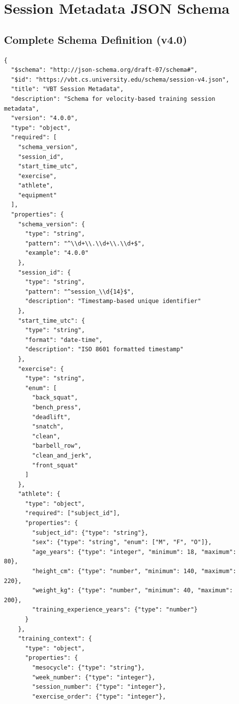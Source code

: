 \chapter{Session Metadata JSON Schema}

\section{Complete Schema Definition (v4.0)}

\begin{lstlisting}[caption={Complete Schema Definition JSON}]
{
  "$schema": "http://json-schema.org/draft-07/schema#",
  "$id": "https://vbt.cs.university.edu/schema/session-v4.json",
  "title": "VBT Session Metadata",
  "description": "Schema for velocity-based training session metadata",
  "version": "4.0.0",
  "type": "object",
  "required": [
    "schema_version",
    "session_id",
    "start_time_utc",
    "exercise",
    "athlete",
    "equipment"
  ],
  "properties": {
    "schema_version": {
      "type": "string",
      "pattern": "^\\d+\\.\\d+\\.\\d+$",
      "example": "4.0.0"
    },
    "session_id": {
      "type": "string",
      "pattern": "^session_\\d{14}$",
      "description": "Timestamp-based unique identifier"
    },
    "start_time_utc": {
      "type": "string",
      "format": "date-time",
      "description": "ISO 8601 formatted timestamp"
    },
    "exercise": {
      "type": "string",
      "enum": [
        "back_squat",
        "bench_press",
        "deadlift",
        "snatch",
        "clean",
        "barbell_row",
        "clean_and_jerk",
        "front_squat"
      ]
    },
    "athlete": {
      "type": "object",
      "required": ["subject_id"],
      "properties": {
        "subject_id": {"type": "string"},
        "sex": {"type": "string", "enum": ["M", "F", "O"]},
        "age_years": {"type": "integer", "minimum": 18, "maximum": 80},
        "height_cm": {"type": "number", "minimum": 140, "maximum": 220},
        "weight_kg": {"type": "number", "minimum": 40, "maximum": 200},
        "training_experience_years": {"type": "number"}
      }
    },
    "training_context": {
      "type": "object",
      "properties": {
        "mesocycle": {"type": "string"},
        "week_number": {"type": "integer"},
        "session_number": {"type": "integer"},
        "exercise_order": {"type": "integer"},

\end{lstlisting}
